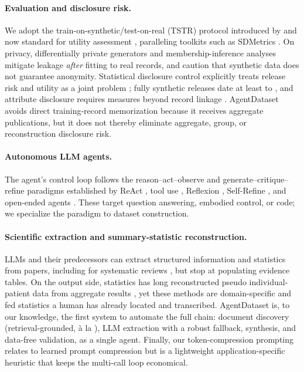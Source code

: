 \documentclass[letterpaper]{article} %
\begin{document}
\paragraph{Evaluation and disclosure risk.}
We adopt the train-on-synthetic/test-on-real (TSTR) protocol introduced by
\citet{esteban2017rcgan} and now standard for utility assessment
\citep{alaa2022faithful}, paralleling toolkits such as SDMetrics
\citep{sdmetrics}. On privacy, differentially private generators
\citep{jordon2019pategan,fang2022dpctgan} and membership-inference analyses
\citep{chen2020ganleaks} mitigate leakage \emph{after} fitting to real records,
and \citet{stadler2022groundhog} caution that synthetic data does not guarantee
anonymity. Statistical disclosure control explicitly treats release risk and
utility as a joint problem \citep{hundepool2012sdc}; fully synthetic releases
date at least to \citet{rubin1993disclosure}, and attribute disclosure requires
measures beyond record linkage \citep{taub2018dcap}. AgentDataset avoids direct
training-record memorization because it receives aggregate publications, but it
does not thereby eliminate aggregate, group, or reconstruction disclosure risk.

\paragraph{Autonomous LLM agents.}
The agent's control loop follows the reason--act--observe and
generate--critique--refine paradigms established by ReAct
\citep{yao2023react}, tool use \citep{schick2023toolformer}, Reflexion
\citep{shinn2023reflexion}, Self-Refine \citep{madaan2023selfrefine}, and
open-ended agents \citep{wang2023voyager,wang2024agentsurvey}. These target
question answering, embodied control, or code; we specialize the paradigm to
dataset construction.

\paragraph{Scientific extraction and summary-statistic reconstruction.}
LLMs and their predecessors \citep{beltagy2019scibert} can extract structured
information and statistics from papers, including for systematic reviews
\citep{sysrev2024extraction}, but stop at populating evidence tables. On the
output side, statistics has long reconstructed pseudo individual-patient data
from aggregate results \citep{papadimitropoulou2020ipd,synthipd2025}, yet these
methods are domain-specific and fed statistics a human has already located and
transcribed. AgentDataset is, to our knowledge, the first system to automate the
full chain: document discovery (retrieval-grounded, à la
\citet{lewis2020rag}), LLM extraction with a robust fallback, synthesis, and
data-free validation, as a single agent. Finally, our token-compression
prompting relates to learned prompt compression \citep{jiang2023llmlingua} but is
a lightweight application-specific heuristic that keeps the multi-call loop
economical.
\end{document}
